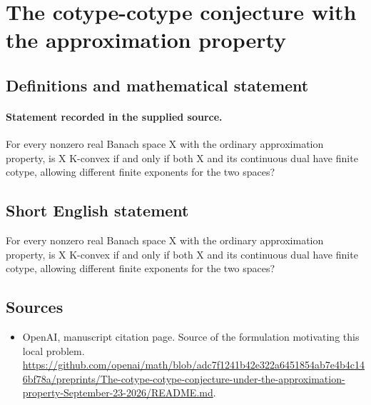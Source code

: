 \documentclass[11pt]{article}
\begin{document}
\section*{The cotype-cotype conjecture with the approximation property}\label{statement}
\subsection{Definitions and mathematical statement}
\paragraph{Statement recorded in the supplied source.}
For every nonzero real Banach space X with the ordinary approximation property, is X K-convex if and only if both X and its continuous dual have finite cotype, allowing different finite exponents for the two spaces?
\subsection{Short English statement}
For every nonzero real Banach space X with the ordinary approximation property, is X K-convex if and only if both X and its continuous dual have finite cotype, allowing different finite exponents for the two spaces?
\subsection{Sources}
\begin{itemize}
\item[S1] OpenAI, manuscript citation page. Source of the formulation motivating this local problem.
\url{https://github.com/openai/math/blob/adc7f1241b42e322a6451854ab7e4b4c146bf78a/preprints/The-cotype-cotype-conjecture-under-the-approximation-property-September-23-2026/README.md}.
\end{itemize}
\end{document}
